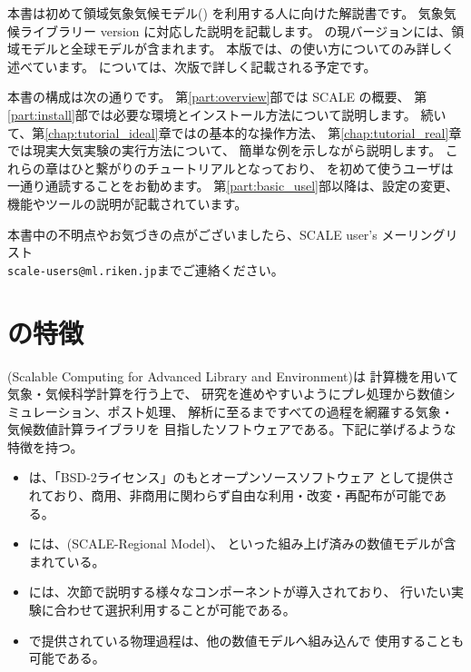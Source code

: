 

本書は初めて領域気象気候モデル({\scalerm})
を利用する人に向けた解説書です。
気象気候ライブラリー{\scalelib}  version \version に対応した説明を記載します。
\scalelib の現バージョンには、領域モデル\scalerm と全球モデル\scalegm が含まれます。
本版では、\scalerm の使い方についてのみ詳しく述べています。
\scalegm については、次版で詳しく記載される予定です。

本書の構成は次の通りです。
第\ref{part:overview}部では SCALE の概要、
第\ref{part:install}部では必要な環境とインストール方法について説明します。
続いて、第\ref{chap:tutorial_ideal}章では\scalerm の基本的な操作方法、
第\ref{chap:tutorial_real}章では現実大気実験の実行方法について、
簡単な例を示しながら説明します。
これらの章はひと繋がりのチュートリアルとなっており、
\scalerm を初めて使うユーザは一通り通読することをお勧めます。
第\ref{part:basic_usel}部以降は、設定の変更、機能やツールの説明が記載されています。

本書中の不明点やお気づきの点がございましたら、SCALE user's メーリングリスト\\
 \verb|scale-users@ml.riken.jp|までご連絡ください。



\section{\scalelib の特徴} \label{subsec:scale_feature}

{\scalelib} (Scalable Computing for Advanced Library and Environment)は
計算機を用いて気象・気候科学計算を行う上で、
研究を進めやすいようにプレ処理から数値シミュレーション、ポスト処理、
解析に至るまですべての過程を網羅する気象・気候数値計算ライブラリを
目指したソフトウェアである。下記に挙げるような特徴を持つ。
\begin{itemize}
\item \scalelib は、「BSD-2ライセンス」のもとオープンソースソフトウェア
として提供されており、商用、非商用に関わらず自由な利用・改変・再配布が可能である。
\item \scalelib には、\scalerm (SCALE-Regional Model)、
といった組み上げ済みの数値モデルが含まれている。
\item \scalelib には、次節で説明する様々なコンポーネントが導入されており、
行いたい実験に合わせて選択利用することが可能である。
\item \scalelib で提供されている物理過程は、他の数値モデルへ組み込んで
使用することも可能である。
\end{itemize}

